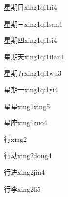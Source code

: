 \begin{verbete}[9;12;4]{星期日}{xing1qi1ri4}
\end{verbete}

\begin{verbete}[9;12;3]{星期三}{xing1qi1san1}
\end{verbete}

\begin{verbete}[9;12;5]{星期四}{xing1qi1si4}
\end{verbete}

\begin{verbete}[9;12;4]{星期天}{xing1qi1tian1}
\end{verbete}

\begin{verbete}[9;12;4]{星期五}{xing1qi1wu3}
\end{verbete}

\begin{verbete}[9;12;1]{星期一}{xing1qi1yi4}
\end{verbete}

\begin{verbete}[9;9]{星星}{xing1xing5}
\end{verbete}

\begin{verbete}[9;10]{星座}{xing1zuo4}
\end{verbete}

\begin{verbete}[6]{行}{xing2}
\end{verbete}

\begin{verbete}[6;6]{行动}{xing2dong4}
\end{verbete}

\begin{verbete}[6;7]{行进}{xing2jin4}
\end{verbete}

\begin{verbete}[6;7]{行李}{xing2li5}
\end{verbete}

